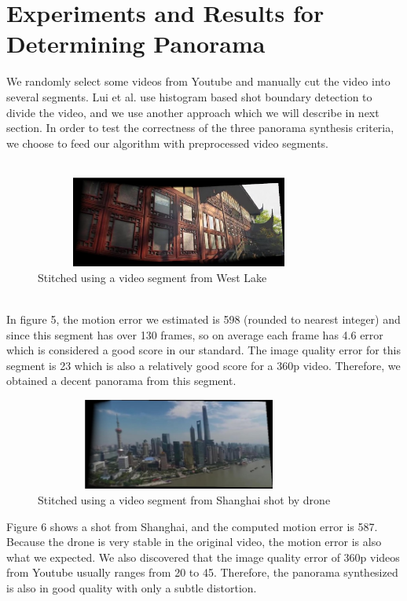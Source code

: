 \documentclass[12pt]{article}
\begin{document}
\section{Experiments and Results for Determining Panorama}
We randomly select some videos from Youtube and manually cut the video into several segments. Lui et al. use histogram based shot boundary detection to divide the video, and we use another approach which we will describe in next section. In order to test the correctness of the three panorama synthesis criteria, we choose to feed our algorithm with preprocessed video segments.\\
\\
\begin{figure}[h]
	\centering
	\includegraphics[width=9.5cm, height=3cm]{building562-691}
	\caption{Stitched using a video segment from West Lake}
\end{figure}\\
In figure 5, the motion error we estimated is 598 (rounded to nearest integer) and since this segment has over 130 frames, so on average each frame has 4.6 error which is considered a good score in our standard. The image quality error for this segment is 23 which is also a relatively good score for a 360p video. Therefore, we obtained a decent panorama from this segment.
\begin{figure}[h]
	\centering
	\includegraphics[width=9.5cm, height=3cm]{shanghai1309-1440}
	\caption{Stitched using a video segment from Shanghai shot by drone}
\end{figure}
Figure 6 shows a shot from Shanghai, and the computed motion error is 587. Because the drone is very stable in the original video, the motion error is also what we expected. We also discovered that the image quality error of 360p videos from Youtube usually ranges from 20 to 45. Therefore, the panorama synthesized is also in good quality with only a subtle distortion. 
\end{document}
